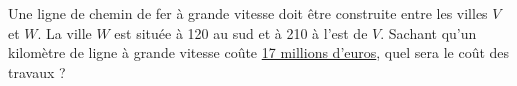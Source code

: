 
\begin{exercice}\label{exosmath-0293}

    Une ligne de chemin de fer à grande vitesse doit être construite entre les villes \( V\) et \( W\). La ville \( W\) est située à \unit{120}{\kilo\meter} au sud et à \unit{210}{\kilo\meter} à l'est de \( V\). Sachant qu'un kilomètre de ligne à grande vitesse coûte \href{http://fr.wikipedia.org/wiki/Lgv}{17 millions d'euros}, quel sera le coût des travaux ?

\end{exercice} 
